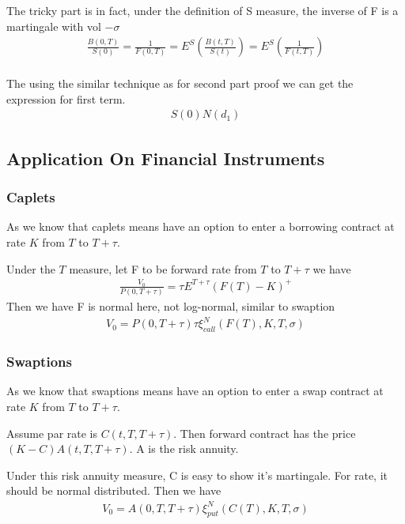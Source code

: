 The tricky part is in fact, under the definition of S measure, the inverse of F is a martingale with vol $-\sigma$
\begin{equation}
\begin{aligned}
\frac{B(0, T)}{S(0)} = \frac{1}{F(0, T)} = E^S(\frac{B(t, T)}{S(t)}) = E^S(\frac{1}{F(t, T)}) \\
\end{aligned}
\end{equation}

The using the similar technique as for second part proof we can get the expression for first term.
\begin{equation}
\begin{aligned}
S(0) N(d_1)
\end{aligned}
\end{equation}


\subsection{Application On Financial Instruments}
\subsubsection{Caplets}
As we know that caplets means have an option to enter a borrowing contract at rate $K$ from $T$ to $T + \tau$.

Under the $T$ measure, let F to be forward rate from $T$ to $T + \tau$ we have
\begin{equation}
\begin{aligned}
\frac{V_0}{P(0, T+\tau)} = \tau E^{T + \tau}(F(T) - K)^+
\end{aligned}
\end{equation}
Then we have {\color{red} F is normal here, not log-normal, similar to swaption}
\begin{equation}
\begin{aligned}
V_0= P(0, T + \tau)\tau \xi^N_{call}(F(T), K, T, \sigma)
\end{aligned}
\end{equation}


\subsubsection{Swaptions}
As we know that swaptions means have an option to enter a swap contract at rate $K$ from $T$ to $T + \tau$.

Assume par rate is $C(t, T, T+\tau)$. Then forward contract has the price $(K - C)A(t, T, T + \tau)$. A is the risk annuity.

Under this risk annuity measure, C is easy to show it's martingale. For rate, it should be normal distributed.
Then we have
\begin{equation}
\begin{aligned}
V_0= A(0,T, T + \tau) \xi^N_{put}(C(T), K, T, \sigma)
\end{aligned}
\end{equation}
